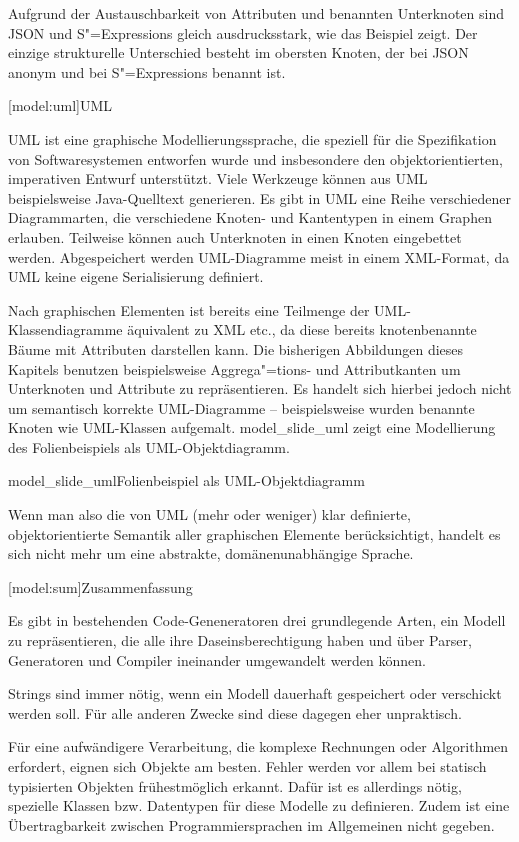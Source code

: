 \documentclass[12pt, a4paper, bibgerm]{scrbook}
\newcommand\lsection{}
\newcommand\abb{}
\newcommand\fig{}
\newcommand{\sexps}{S"=Expressions}
\begin{document}
Aufgrund der Austauschbarkeit von Attributen und benannten Unterknoten
sind JSON und \sexps{} gleich ausdrucksstark, wie das Beispiel
zeigt. Der einzige strukturelle Unterschied besteht im obersten Knoten,
der bei JSON anonym und bei \sexps{} benannt ist.

\lsection[model:uml]{UML}

UML ist eine graphische Modellierungssprache, die speziell für die
Spezifikation von Softwaresystemen entworfen wurde und insbesondere den
objektorientierten, imperativen Entwurf unterstützt. Viele Werkzeuge können
aus UML beispielsweise Java-Quelltext generieren. Es gibt in UML eine
Reihe verschiedener Diagrammarten, die verschiedene Knoten- und
Kantentypen in einem Graphen erlauben. Teilweise können auch Unterknoten
in einen Knoten eingebettet werden. Abgespeichert werden UML-Diagramme
meist in einem XML-Format, da UML keine eigene Serialisierung definiert.

Nach graphischen Elementen ist bereits eine Teilmenge der
UML-Klassen\-diagramme äquivalent zu XML etc., da diese bereits
knotenbenannte Bäume mit Attributen darstellen kann. Die bisherigen
Abbildungen dieses Kapitels benutzen beispielsweise Aggrega"=tions- und
Attributkanten um Unterknoten und Attribute zu repräsentieren.  Es
handelt sich hierbei jedoch nicht um semantisch korrekte UML-Diagramme --
beispielsweise wurden benannte Knoten wie UML-Klassen
aufgemalt. \abb{model_slide_uml} zeigt eine Modellierung des
Folienbeispiels als UML-Objektdiagramm.

\fig{model_slide_uml}{Folienbeispiel als UML-Objektdiagramm}

Wenn man also die von UML (mehr oder weniger) klar definierte,
objektorientierte Semantik aller graphischen Elemente berücksichtigt,
handelt es sich nicht mehr um eine abstrakte, domänenunabhängige
Sprache.

\lsection[model:sum]{Zusammenfassung}

Es gibt in bestehenden Code-Geneneratoren drei grundlegende Arten, ein
Modell zu repräsentieren, die alle ihre Daseinsberechtigung haben und
über Parser, Generatoren und Compiler ineinander umgewandelt werden
können.

Strings sind immer nötig, wenn ein Modell dauerhaft gespeichert oder
verschickt werden soll. Für alle anderen Zwecke sind diese dagegen eher
unpraktisch.

Für eine aufwändigere Verarbeitung, die komplexe Rechnungen oder
Algorithmen erfordert, eignen sich Objekte am besten. Fehler werden vor
allem bei statisch typisierten Objekten frühestmöglich erkannt. Dafür
ist es allerdings nötig, spezielle Klassen bzw. Datentypen für diese
Modelle zu definieren. Zudem ist eine Übertragbarkeit zwischen
Programmiersprachen im Allgemeinen nicht gegeben.
\end{document}

